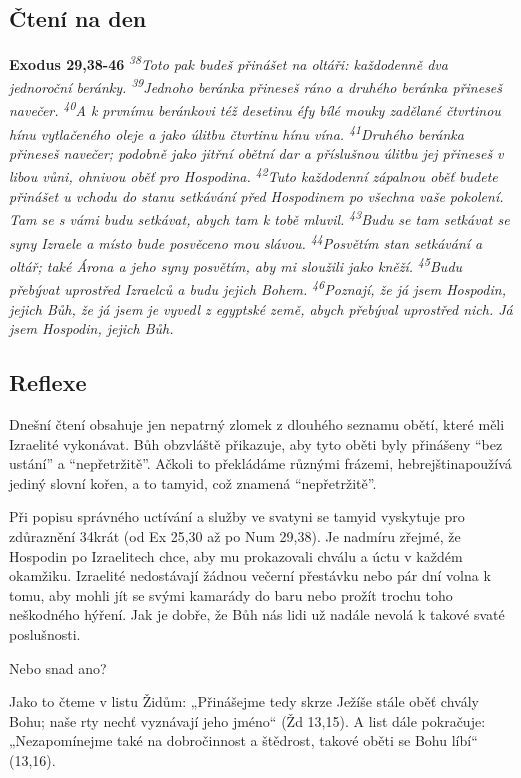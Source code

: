 \documentclass[11pt]{article}
\begin{document}
\subsection*{Čtení na den}
\textbf{Exodus 29,38-46}
\newline
\textit{
\textsuperscript{38}Toto pak budeš přinášet na oltáři: každodenně dva jednoroční beránky.
\textsuperscript{39}Jednoho beránka přineseš ráno a druhého beránka přineseš navečer.
\textsuperscript{40}A k prvnímu beránkovi též desetinu éfy bílé mouky zadělané čtvrtinou hínu vytlačeného oleje a jako úlitbu čtvrtinu hínu vína.
\textsuperscript{41}Druhého beránka přineseš navečer; podobně jako jitřní obětní dar a příslušnou úlitbu jej přineseš v libou vůni, ohnivou oběť pro Hospodina.
\textsuperscript{42}Tuto každodenní zápalnou oběť budete přinášet u vchodu do stanu setkávání před Hospodinem po všechna vaše pokolení. Tam se s vámi budu setkávat, abych tam k tobě mluvil.
\textsuperscript{43}Budu se tam setkávat se syny Izraele a místo bude posvěceno mou slávou.
\textsuperscript{44}Posvětím stan setkávání a oltář; také Árona a jeho syny posvětím, aby mi sloužili jako kněží.
\textsuperscript{45}Budu přebývat uprostřed Izraelců a budu jejich Bohem.
\textsuperscript{46}Poznají, že já jsem Hospodin, jejich Bůh, že já jsem je vyvedl z egyptské země, abych přebýval uprostřed nich. Já jsem Hospodin, jejich Bůh.
}

\subsection*{Reflexe}
Dnešní čtení obsahuje jen nepatrný zlomek z dlouhého seznamu obětí, které měli Izraelité vykonávat. Bůh obzvláště
přikazuje, aby tyto oběti byly přinášeny “bez ustání” a “nepřetržitě”. Ačkoli to překládáme různými frázemi,
hebrejštinapoužívá jediný slovní kořen, a to tamyid, což znamená “nepřetržitě”.

Při popisu správného uctívání a služby ve svatyni se tamyid vyskytuje pro zdůraznění 34krát (od Ex 25,30 až po Num
29,38). Je nadmíru zřejmé, že Hospodin po Izraelitech chce, aby mu prokazovali chválu a úctu v každém okamžiku.
Izraelité nedostávají žádnou večerní přestávku nebo pár dní volna k tomu, aby mohli jít se svými kamarády do baru
nebo prožít trochu toho neškodného hýření. Jak je dobře, že Bůh nás lidi už nadále nevolá k takové svaté poslušnosti.

Nebo snad ano?

Jako to čteme v listu Židům: „Přinášejme tedy skrze Ježíše stále oběť chvály Bohu; naše rty nechť vyznávají jeho
jméno“ (Žd 13,15). A list dále pokračuje: „Nezapomínejme také na dobročinnost a štědrost, takové oběti se Bohu líbí“
(13,16).
\end{document}

